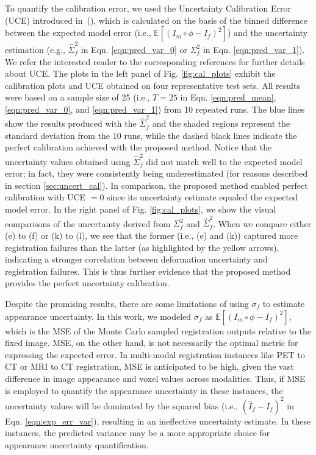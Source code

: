 \documentclass[times,twocolumn,final]{elsarticle}
\begin{document}
To quantify the calibration error, we used the Uncertainty Calibration Error (UCE) introduced in~(\cite{pmlr-v121-laves20a}), which is calculated on the basis of the binned difference between the expected model error (i.e., $\mathbb{E}\left[(I_m\circ\phi-I_f)^2\right]$) and the uncertainty estimation (e.g., $\hat{\Sigma}^2_f$ in Eqn. \ref{eqn:pred_var_0} or $\Sigma^2_f$ in Eqn. \ref{eqn:pred_var_1}). We refer the interested reader to the corresponding references for further details about UCE. The plots in the left panel of Fig. \ref{fig:cal_plots} exhibit the calibration plots and UCE obtained on four representative test sets. All results were based on a sample size of 25 (i.e., $T=25$ in Eqn. \ref{eqn:pred_mean}, \ref{eqn:pred_var_0}, and \ref{eqn:pred_var_1}) from 10 repeated runs. The blue lines show the results produced with the $\hat{\Sigma}^2_f$ and the shaded regions represent the standard deviation from the 10 runs, while the dashed black lines indicate the perfect calibration achieved with the proposed method. Notice that the uncertainty values obtained using $\hat{\Sigma}^2_f$ did not match well to the expected model error; in fact, they were consistently being underestimated (for reasons described in section \ref{sec:uncert_cal}). In comparison, the proposed method enabled perfect calibration with UCE $=0$ since its uncertainty estimate equaled the expected model error. In the right panel of Fig. \ref{fig:cal_plots}, we show the visual comparisons of the uncertainty derived from $\Sigma^2_f$ and $\hat{\Sigma}^2_f$. When we compare either (e) to (f) or (k) to (l), we see that the former (i.e., (e) and (k)) captured more registration failures than the latter (as highlighted by the yellow arrows), indicating a stronger correlation between deformation uncertainty and registration failures. This is thus further evidence that the proposed method provides the perfect uncertainty calibration.

Despite the promising results, there are some limitations of using $\sigma_f$ to estimate appearance uncertainty. In this work, we modeled $\sigma_f$ as $\mathbb{E}\left[(I_m\circ\phi-I_f)^2\right]$, which is the MSE of the Monte Carlo sampled registration outputs relative to the fixed image. MSE, on the other hand, is not necessarily the optimal metric for expressing the expected error. In multi-modal registration instances like PET to CT or MRI to CT registration, MSE is anticipated to be high, given the vast difference in image appearance and voxel values across modalities. Thus, if MSE is employed to quantify the appearance uncertainty in these instances, the uncertainty values will be dominated by the squared bias (i.e., $(\hat{I}_f-I_f)^2$ in Eqn. \ref{eqn:exp_err_var}), resulting in an ineffective uncertainty estimate. In these instances, the predicted variance may be a more appropriate choice for appearance uncertainty quantification.
\end{document}
